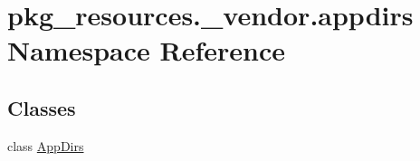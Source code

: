\hypertarget{namespacepkg__resources_1_1__vendor_1_1appdirs}{}\section{pkg\+\_\+resources.\+\_\+vendor.\+appdirs Namespace Reference}
\label{namespacepkg__resources_1_1__vendor_1_1appdirs}
\subsection*{Classes}
\begin{DoxyCompactItemize}
\item 
class \hyperlink{classpkg__resources_1_1__vendor_1_1appdirs_1_1_app_dirs}{App\+Dirs}
\end{DoxyCompactItemize}
